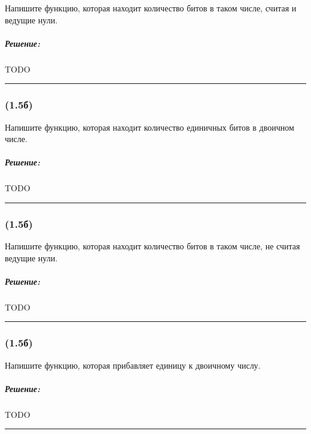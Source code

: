 \documentclass{article}
\newenvironment{proof}{\subparagraph{\hspace{-1em}Решение:\newline}}{\par\noindent\rule{\textwidth}{0.4pt}}
\begin{document}
    Напишите функцию, которая находит количество битов в таком числе, считая и
    ведущие нули.

    \begin{proof}
        TODO %
    \end{proof}

    \subsubsection{(1.5б)}
    Напишите функцию, которая находит количество единичных битов в двоичном числе.

    \begin{proof}
        TODO %
    \end{proof}

    \subsubsection{(1.5б)}
    Напишите функцию, которая находит количество битов в таком числе, не считая ведущие нули.
    
    \begin{proof}
        TODO %
    \end{proof}

    \subsubsection{(1.5б)}
    Напишите функцию, которая прибавляет единицу к двоичному числу.

    \begin{proof}
        TODO %
    \end{proof}
    
\end{document}
